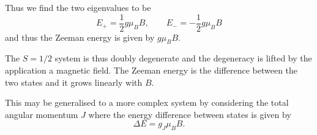 Thus we find the two eigenvalues to be
$$E_+ =\frac{1}{2}g\mu_BB, \qquad E_-=-\frac{1}{2}g\mu_BB$$
and thus the Zeeman energy is given by $g\mu_B B$. 

The $S=1/2$ system is thus doubly degenerate and the degeneracy is lifted by the application a magnetic field. The Zeeman energy is the difference between the two states and it grows linearly with $B$. 

This may be generalised to a more complex system by considering the total angular momentum $J$ where the energy difference between states is given by 
\begin{equation}
   \Delta E = g_J \mu_B B. 
    \label{eq:zeeman_energy}
\end{equation}






